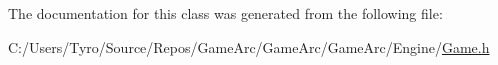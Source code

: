 The documentation for this class was generated from the following file\+:\begin{DoxyCompactItemize}
\item 
C\+:/\+Users/\+Tyro/\+Source/\+Repos/\+Game\+Arc/\+Game\+Arc/\+Game\+Arc/\+Engine/\mbox{\hyperlink{_game_8h}{Game.\+h}}\end{DoxyCompactItemize}
